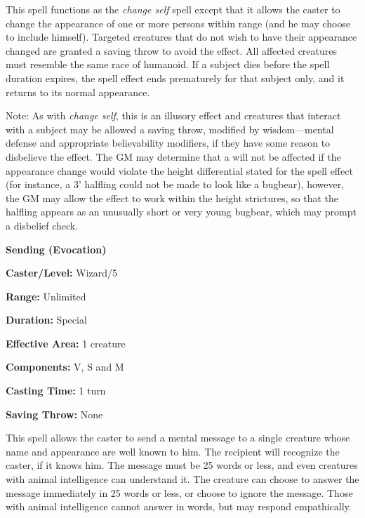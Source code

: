 \begin{multicols}{2}
\begin{minipage}{\columnwidth}
\end{minipage}

This spell functions as the \textit{change self} spell except that it allows the caster to change the appearance of one or more persons within range (and he may choose to include himself).  Targeted creatures that do not wish to have their appearance changed are granted a saving throw to avoid the effect.  All affected creatures must resemble the same race of humanoid.  If a subject dies before the spell duration expires, the spell effect ends prematurely for that subject only, and it returns to its normal appearance.  

Note: As with \textit{change self}, this is an illusory effect and creatures that interact with a subject may be allowed a saving throw, modified by wisdom---mental defense and appropriate believability modifiers, if they have some reason to disbelieve the effect.  The GM may determine that a will not be affected if the appearance change would violate the height differential stated for the spell effect (for instance, a 3' halfling could not be made to look like a bugbear), however, the GM may allow the effect to work within the height strictures, so that the halfling appears as an unusually short or very young bugbear, which may prompt a disbelief check.
 
\vspace{1em}

\noindent
\begin{minipage}{\columnwidth}

\noindent \textbf{Sending (Evocation)}

\noindent \textbf{Caster/Level:} Wizard/5

\noindent \textbf{Range:} Unlimited

\noindent \textbf{Duration:} Special

\noindent \textbf{Effective Area:} 1 creature

\noindent \textbf{Components:} V, S and M

\noindent \textbf{Casting Time:} 1 turn

\noindent \textbf{Saving Throw:} None

\end{minipage}

This spell allows the caster to send a mental message to a single creature whose name and appearance are well known to him. The recipient will recognize the caster, if it knows him.  The message must be 25 words or less, and even creatures with animal intelligence can understand it.  The creature can choose to answer the message immediately in 25 words or less, or choose to ignore the message.  Those with animal intelligence cannot answer in words, but may respond empathically.  


\end{multicols}
